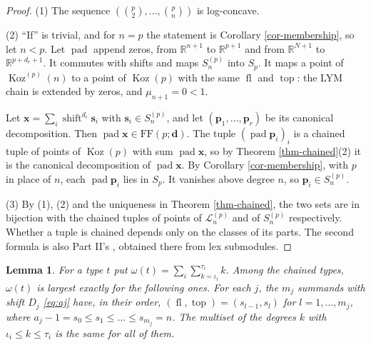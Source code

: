 \documentclass[11pt, a4paper, abstract=yes]{scrartcl}
\theoremstyle{definition}
\theoremstyle{remark}
\theoremstyle{plain}
\newtheorem{lemma}[definition]{Lemma}
\newcommand{\vek}[1]{\boldsymbol{#1}}
\theoremstyle{remark}
\theoremstyle{plain}
\newcommand{\Koz}{\operatorname{Koz}}
\newcommand{\shift}{\operatorname{shift}}
\newcommand{\tp}{\operatorname{top}}
\newcommand{\FF}{\mathrm{FF}}
\newcommand{\fl}{\operatorname{fl}}
\newcommand{\leannone}{\tikz[baseline=-0.6ex]\draw[leannone,line width=0.6pt] (0,0) circle (0.55ex);}
\newcommand{\leanmark}[1]{\leavevmode{\reversemarginpar\marginnote{\raggedleft#1}}}
\let\autocite\cite
\begin{document}
\begin{proof}
(1) The sequence \((\binom p2,\dots,\binom pn)\) is log-concave.

(2) ``If'' is trivial, and for \(n=p\) the statement is Corollary \ref{cor-membership}, so let \(n<p\).
Let \(\operatorname{pad}\) append zeros, from \(\mathbb R^{n+1}\) to \(\mathbb R^{p+1}\) and from
\(\mathbb R^{N+1}\) to \(\mathbb R^{p+d_r+1}\). It commutes with shifts and maps \(S_n^{(p)}\) into
\(S_p\). It maps a point of \(\Koz^{(p)}(n)\) to a point of \(\Koz(p)\) with the same \(\fl\) and
\(\tp\): the LYM chain is extended by zeros, and \(\mu_{n+1}=0<1\).

Let \(\vek x=\sum_i\shift^{d_i}\vek s_i\) with \(\vek s_i\in S_n^{(p)}\), and let
\((\vek p_1,\dots,\vek p_r)\) be its canonical decomposition. Then
\(\operatorname{pad}\vek x\in\FF(p;\vek d)\). The tuple \((\operatorname{pad}\vek p_i)_i\) is a
chained tuple of points of \(\Koz(p)\) with sum \(\operatorname{pad}\vek x\), so by
Theorem \ref{thm-chained}(2) it is the canonical decomposition of \(\operatorname{pad}\vek x\). By
Corollary \ref{cor-membership}, with \(p\) in place of \(n\), each \(\operatorname{pad}\vek p_i\) lies
in \(S_p\). It vanishes above degree \(n\), so \(\vek p_i\in S_n^{(p)}\).

(3) By (1), (2) and the uniqueness in Theorem \ref{thm-chained}, the two sets are in bijection with
the chained tuples of points of \(\mathcal L_n^{(p)}\) and of \(S_n^{(p)}\) respectively. Whether a
tuple is chained depends only on the classes of its parts. The second formula is also Part II's
\autocite[Theorem 60]{SnellmanArticle2}, obtained there from lex submodules.
\end{proof}

\begin{lemma}
\leanmark{\leannone}For a type \(t\) put \(\omega(t)=\sum_i\sum_{k=\iota_i}^{\tau_i}k\). Among the chained types, \(\omega(t)\) is
largest exactly for the following ones. For each \(j\), the \(m_j\) summands with shift \(D_j\) \eqref{eq:aj}
have, in their order, \((\fl,\tp)=(s_{l-1},s_l)\) for \(l=1,\dots,m_j\), where
\(a_j-1=s_0\le s_1\le\dots\le s_{m_j}=n\). The multiset of the degrees \(k\) with
\(\iota_i\le k\le\tau_i\) is the same for all of them.
\label{lem-kup-dominant}
\end{lemma}
\end{document}
